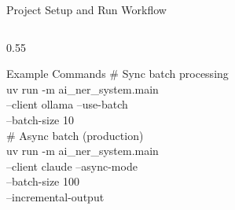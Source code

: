 \documentclass[
        11pt,
        compress,
        xcolor={dvipsnames}
    ]{beamer}
\begin{document}
\begin{frame}[shrink=4]{Project Setup and Run Workflow}
\begin{columns}[T]
\begin{column}{0.55\textwidth}
\begin{block}{Example Commands}
        \textrm{\# Sync batch processing}\\
        uv run -m ai\_ner\_system.main\\
        \hspace*{1em}--client ollama --use-batch\\
        \hspace*{1em}--batch-size 10\\[0.3em]
        \textrm{\# Async batch (production)}\\
        uv run -m ai\_ner\_system.main\\
        \hspace*{1em}--client claude --async-mode\\
        \hspace*{1em}--batch-size 100\\
        \hspace*{1em}--incremental-output
      \end{block}
    \end{column}
  \end{columns}
\end{frame}
\end{document}
